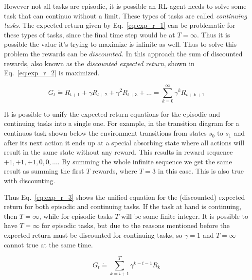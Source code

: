 However not all tasks are episodic, it is possible an RL-agent needs to solve some task that can continuo without a limit. These types of tasks are called \emph{continuing tasks}. The expected return given by Eq.~\ref{eq:exp_r_1} can be problematic for these types of tasks, since the final time step would be at $T=\infty$. Thus it is possible the value it's trying to maximize is infinite as well. Thus to solve this problem the rewards can be $discounted$. In this approach the sum of discounted rewards, also known as the \emph{discounted expected return}, shown in Eq.~\ref{eq:exp_r_2} is maximized.

\begin{equation}
  G_t \dot{=} R_{t+1} + \gamma R_{t+2} + \gamma^2 R_{t+3} + \ldots = \sum_{k=0}^{\infty}\gamma^kR_{t+k+1}
  \label{eq:exp_r_2}
\end{equation}


It is possible to unify the expected return equations for the episodic and continuing tasks into a single one. For example, in the transition diagram for a continuos task shown below the environment transitions from states $s_0$ to $s_1$ and after its next action it ends up at a special absorbing state where all actions will result in the same state without any reward. This results in reward sequence $+1, +1, +1, 0, 0, \ldots$. By summing the whole infinite sequence we get the same result as summing the first $T$ rewards, where $T=3$ in this case. This is also true with discounting. 

Thus Eq.~\ref{eq:exp_r_3} shows the unified equation for the (discounted) expected return for both episodic and continuing tasks. If the task at hand is continuing, then $T=\infty$, while for episodic tasks $T$ will be some finite integer. It is possible to have $T=\infty$ for episodic tasks, but due to the reasons mentioned before the expected return must be discounted for continuing tasks, so $\gamma=1$ and $T=\infty$ cannot true at the same time.

\begin{equation}
  G_t \dot{=} \sum_{k=t+1}^{T}\gamma^{k-t-1}R_{k}
  \label{eq:exp_r_3}
\end{equation}

